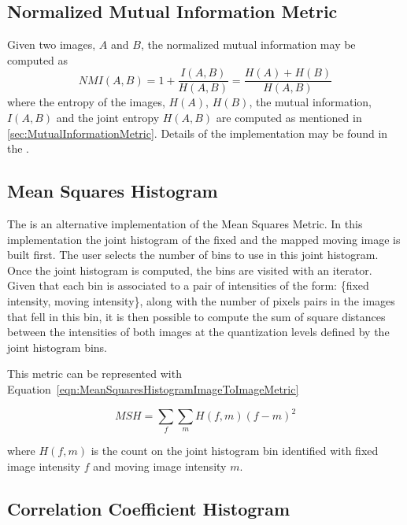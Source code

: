 \subsection{Normalized Mutual Information Metric}
Given two images, $A$ and $B$, the normalized mutual information may be computed as
\begin{equation}
NMI(A,B) = 1 + \frac{I(A,B)}{H(A,B)} = \frac{H(A) + H(B)}{H(A,B)}
\end{equation}
where the entropy of the images, $H(A)$, $H(B)$, the mutual
information, $I(A,B)$ and the joint entropy $H(A,B)$ are computed as mentioned
in \ref{sec:MutualInformationMetric}. Details of the implementation may be found in
the \cite{Hajnal2001}.

\subsection{Mean Squares Histogram}

The  is an alternative
implementation of the Mean Squares Metric. In this implementation the joint
histogram of the fixed and the mapped moving image is built first. The user
selects the number of bins to use in this joint histogram. Once the joint
histogram is computed, the bins are visited with an iterator. Given that each
bin is associated to a pair of intensities of the form: \{fixed intensity,
moving intensity\}, along with the number of pixels pairs in the images that
fell in this bin, it is then possible to compute the sum of square distances
between the intensities of both images at the quantization levels defined by
the joint histogram bins.

This metric can be represented with
Equation~\ref{eqn:MeanSquaresHistogramImageToImageMetric}

\begin{equation}
\label{eqn:MeanSquaresHistogramImageToImageMetric}
MSH = \sum_f \sum_m { H(f,m) { \left( f - m \right) } ^ 2 }
\end{equation}

where $H(f,m)$ is the count on the joint histogram bin identified with fixed image
intensity $f$ and moving image intensity $m$.


\subsection{Correlation Coefficient Histogram}

